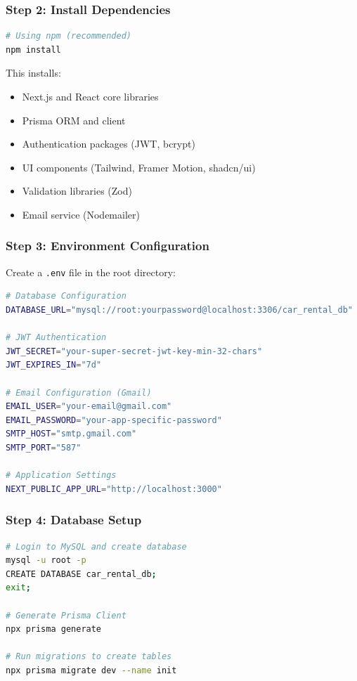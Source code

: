 \documentclass[12pt,a4paper]{article}
\begin{document}
\subsubsection{Step 2: Install Dependencies}

\begin{lstlisting}[language=bash]
# Using npm (recommended)
npm install
\end{lstlisting}

This installs:
\begin{itemize}
    \item Next.js and React core libraries
    \item Prisma ORM and client
    \item Authentication packages (JWT, bcrypt)
    \item UI components (Tailwind, Framer Motion, shadcn/ui)
    \item Validation libraries (Zod)
    \item Email service (Nodemailer)
\end{itemize}

\subsubsection{Step 3: Environment Configuration}

Create a \texttt{.env} file in the root directory:

\begin{lstlisting}[language=bash]
# Database Configuration
DATABASE_URL="mysql://root:yourpassword@localhost:3306/car_rental_db"

# JWT Authentication
JWT_SECRET="your-super-secret-jwt-key-min-32-chars"
JWT_EXPIRES_IN="7d"

# Email Configuration (Gmail)
EMAIL_USER="your-email@gmail.com"
EMAIL_PASSWORD="your-app-specific-password"
SMTP_HOST="smtp.gmail.com"
SMTP_PORT="587"

# Application Settings
NEXT_PUBLIC_APP_URL="http://localhost:3000"
\end{lstlisting}

\subsubsection{Step 4: Database Setup}

\begin{lstlisting}[language=bash]
# Login to MySQL and create database
mysql -u root -p
CREATE DATABASE car_rental_db;
exit;

# Generate Prisma Client
npx prisma generate

# Run migrations to create tables
npx prisma migrate dev --name init
\end{lstlisting}
\end{document}
